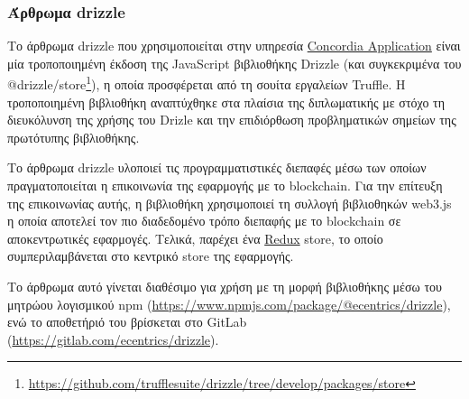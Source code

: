 \subsubsection{Άρθρωμα drizzle} \label{subsubsection:4-3-1-drizzle-unit}

Το άρθρωμα drizzle που χρησιμοποιείται στην υπηρεσία \hyperref[subsection:4-3-2-concordia-application-service]{Concordia Application} είναι μία τροποποιημένη έκδοση της JavaScript βιβλιοθήκης Drizzle (και συγκεκριμένα του @drizzle/store\footnote{\url{https://github.com/trufflesuite/drizzle/tree/develop/packages/store}}), η οποία προσφέρεται από τη σουίτα εργαλείων Truffle. Η τροποποιημένη βιβλιοθήκη αναπτύχθηκε στα πλαίσια της διπλωματικής με στόχο τη διευκόλυνση της χρήσης του Drizle και την επιδιόρθωση προβληματικών σημείων της πρωτότυπης βιβλιοθήκης.

Το άρθρωμα drizzle υλοποιεί τις προγραμματιστικές διεπαφές μέσω των οποίων πραγματοποιείται η επικοινωνία της εφαρμογής με το blockchain. Για την επίτευξη της επικοινωνίας αυτής, η βιβλιοθήκη χρησιμοποιεί τη συλλογή βιβλιοθηκών web3.js η οποία αποτελεί τον πιο διαδεδομένο τρόπο διεπαφής με το blockchain σε αποκεντρωτικές εφαρμογές. Τελικά, παρέχει ένα \hyperref[subsection:4-2-2-2-redux]{Redux} store, το οποίο συμπεριλαμβάνεται στο κεντρικό store της εφαρμογής.

Το άρθρωμα αυτό γίνεται διαθέσιμο για χρήση με τη μορφή βιβλιοθήκης μέσω του μητρώου λογισμικού npm (\url{https://www.npmjs.com/package/@ecentrics/drizzle}), ενώ το αποθετήριό του βρίσκεται στο GitLab (\url{https://gitlab.com/ecentrics/drizzle}).